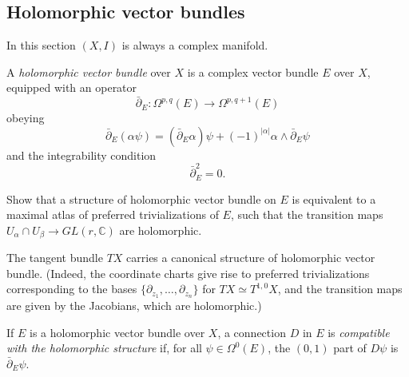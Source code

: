 \documentclass[12pt,letterpaper,reqno]{amsart}
\numberwithin{equation}{section}
\newcommand{\C}{\ensuremath{\mathbb C}}
\newcommand{\de}{\mathrm{d}}
\newcommand{\abs}[1]{\lvert#1\rvert}
\newcommand{\ti}[1]{\textit{#1}}
\begin{document}
\subsection{Holomorphic vector bundles}

In this section $(X,I)$ is always a complex manifold.

\begin{defn} A \ti{holomorphic vector bundle} over $X$ is a complex vector bundle $E$ over $X$, equipped with an operator
\begin{equation}
  \bar\partial_E :  \Omega^{p,q}(E) \to \Omega^{p,q+1}(E)
\end{equation}
obeying
\begin{equation}
  \bar\partial_E (\alpha \psi) = (\bar\partial_E \alpha) \psi + (-1)^{\abs{\alpha}} \alpha \wedge \bar\partial_E \psi
\end{equation}
and the integrability condition
\begin{equation}
  \bar\partial_E^2 = 0.
\end{equation}
\end{defn}

\begin{exercise} Show that a structure of holomorphic vector bundle on $E$ is equivalent to a maximal atlas 
of preferred trivializations of $E$, such that
the transition maps 
$U_\alpha \cap U_\beta \to GL(r,\C)$ 
are holomorphic.
\end{exercise}


\begin{example} The tangent bundle $TX$ carries
a canonical structure of holomorphic vector bundle.
(Indeed, the coordinate charts give rise to 
preferred trivializations corresponding 
to the bases $\{\partial_{z_1}, \dots, \partial_{z_n} \}$
for $TX \simeq T^{1,0} X$, and the transition 
maps are given 
by the Jacobians, which are holomorphic.)
\end{example}

\begin{defn}
If $E$ is a holomorphic vector bundle over $X$,
a connection $D$ in $E$ is \ti{compatible with the
holomorphic structure} if, for all 
$\psi \in \Omega^0(E)$, the $(0,1)$ part of $D \psi$ 
is $\bar\partial_E \psi$.
\end{defn}
\end{document}
